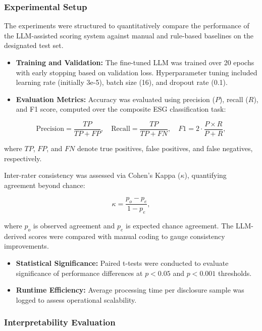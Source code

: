 \documentclass[
  12pt,
]{article}
\begin{document}
\subsubsection{Experimental Setup}\label{experimental-setup}

The experiments were structured to quantitatively compare the
performance of the LLM-assisted scoring system against manual and
rule-based baselines on the designated test set.

\begin{itemize}
\item
  \textbf{Training and Validation:} The fine-tuned LLM was trained over
  20 epochs with early stopping based on validation loss. Hyperparameter
  tuning included learning rate (initially 3e-5), batch size (16), and
  dropout rate (0.1).
\item
  \textbf{Evaluation Metrics:} Accuracy was evaluated using precision
  (\(P\)), recall (\(R\)), and F1 score, computed over the composite ESG
  classification task:
\end{itemize}

\[
\text{Precision} = \frac{TP}{TP + FP}, \quad \text{Recall} = \frac{TP}{TP + FN}, \quad F1 = 2 \cdot \frac{P \times R}{P + R},
\]

where \(TP\), \(FP\), and \(FN\) denote true positives, false positives,
and false negatives, respectively.

Inter-rater consistency was assessed via Cohen's Kappa (\(\kappa\)),
quantifying agreement beyond chance:

\[
\kappa = \frac{p_o - p_e}{1 - p_e},
\]

where \(p_o\) is observed agreement and \(p_e\) is expected chance
agreement. The LLM-derived scores were compared with manual coding to
gauge consistency improvements.

\begin{itemize}
\item
  \textbf{Statistical Significance:} Paired t-tests were conducted to
  evaluate significance of performance differences at \(p < 0.05\) and
  \(p < 0.001\) thresholds.
\item
  \textbf{Runtime Efficiency:} Average processing time per disclosure
  sample was logged to assess operational scalability.
\end{itemize}

\subsubsection{Interpretability
Evaluation}\label{interpretability-evaluation}
\end{document}
